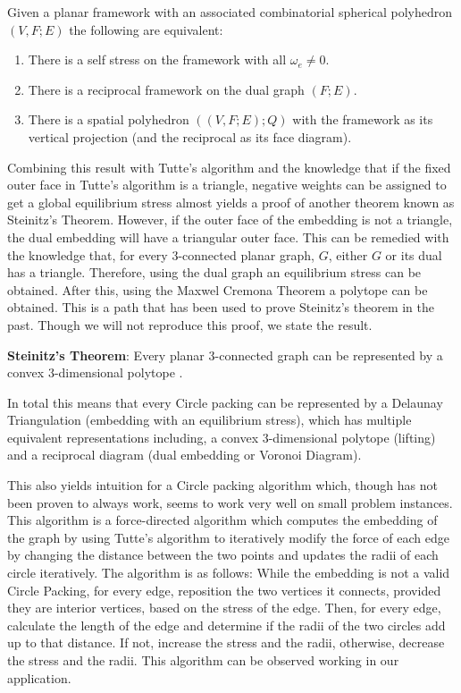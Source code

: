 \documentclass[11pt]{article}
\begin{document}
Given a planar framework with an associated combinatorial spherical polyhedron $(V,F;E)$ the following are equivalent:
\begin{enumerate}
	\item There is a self stress on the framework with all $\omega_e \neq 0$.
	\item There is a reciprocal framework on the dual graph $(F;E)$.
	\item There is a spatial polyhedron $((V,F;E);Q)$ with the framework as its vertical projection (and the reciprocal as its face diagram).
 \end{enumerate}
 
 Combining this result with Tutte's algorithm and the knowledge that if the fixed outer face in Tutte's algorithm is a triangle, negative weights can be assigned to get a global equilibrium stress almost yields a proof of another theorem known as Steinitz's Theorem. However, if the outer face of the embedding is not a triangle, the dual embedding will have a triangular outer face. This can be remedied with the knowledge that, for every 3-connected planar graph, $G$, either $G$ or its dual has a triangle. Therefore, using the dual graph an equilibrium stress can be obtained. After this, using the Maxwel Cremona Theorem a polytope can be obtained. This is a path that has been used to prove Steinitz's theorem in the past. Though we will not reproduce this proof, we state the result. 
 
 \textbf{Steinitz's Theorem}: Every planar 3-connected graph can be represented by a convex 3-dimensional polytope \cite{realizationSpaces}.
 
 In total this means that every Circle packing can be represented by a Delaunay Triangulation (embedding with an equilibrium stress), which has multiple equivalent representations including, a convex 3-dimensional polytope (lifting) and a reciprocal diagram (dual embedding or Voronoi Diagram). 

This also yields intuition for a Circle packing algorithm which, though has not been proven to always work, seems to work very well on small problem instances. This algorithm is a force-directed algorithm which computes the embedding of the graph by using Tutte's algorithm to iteratively modify the force of each edge by changing the distance between the two points and updates the radii of each circle iteratively. The algorithm is as follows: While the embedding is not a valid Circle Packing, for every edge, reposition the two vertices it connects, provided they are interior vertices, based on the stress of the edge. Then, for every edge, calculate the length of the edge and determine if the radii of the two circles add up to that distance. If not, increase the stress and the radii, otherwise, decrease the stress and the radii. This algorithm can be observed working in our application.
 
\end{document}
